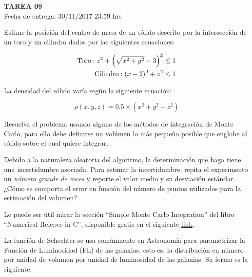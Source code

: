\documentclass[letter, 11pt]{article}
\newcommand{\tareanro}{09}
\newcommand{\fechaentrega}{30/11/2017 23:59 hrs}
\begin{document}
\thispagestyle{firstpage}

\begin{center}
  {\uppercase{\LARGE \bf Tarea \tareanro}}\\
  Fecha de entrega: \fechaentrega
\end{center}



Estime la posición del centro de masa de un sólido descrito por la
intersección de un toro y un cilindro dados por las siguientes ecuaciones:

\begin{align}
  {\rm Toro} : z^2 + \left( \sqrt{x^2 + y^2} - 3 \right)^2 &\leq 1\\
  {\rm Cilindro} : (x - 2)^2 + z^2 &\leq 1
\end{align}

La densidad del sólido varía según la siguiente ecuación:

$$ \rho(x, y, z) = 0.5 \times (x^2 + y^2 + z^2) $$

Resuelva el problema usando alguno de los métodos de integración de Monte
Carlo, para ello debe definirse un volúmen lo más pequeño posible que englobe
al sólido sobre el cual quiere integrar.

Debido a la naturaleza aleatoria del algoritmo, la determinación que haga tiene
una incertidumbre asociada. Para estimar la incertidumbre, repita el
experimento un {\it número grande de veces} y reporte el valor medio y su
desviación estándar. ¿Cómo se comporta el error en función del número de puntos
utilizados para la estimación del volumen?

\begin{ayuda}
  \small

  Le puede ser útil mirar la sección ``Simple Monte Carlo Integration'' del
  libro ``Numerical Reicpes in C'', disponible gratis en el siguiente
  \href{http://apps.nrbook.com/c/index.html}{link}.

\end{ayuda}

\vspace{1em}

La función de Schechter se usa comúnmente en Astronomía para parametrizar la
Función de Luminosidad (FL) de las galaxias, esto es, la distribución en número
por unidad de volumen por unidad de luminosidad de las galaxias. Su forma es la
siguiente:
\end{document}
